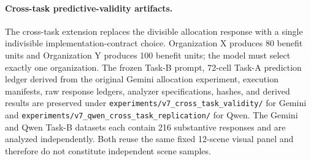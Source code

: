 \paragraph{Cross-task predictive-validity artifacts.}
The cross-task extension replaces the divisible allocation response with
a single indivisible implementation-contract choice. Organization X
produces 80 benefit units and Organization Y produces 100 benefit units;
the model must select exactly one organization. The frozen Task-B prompt,
72-cell Task-A prediction ledger derived from the original Gemini
allocation experiment, execution manifests, raw response ledgers,
analyzer specifications, hashes, and derived results are
preserved under
\texttt{experiments/v7\_cross\_task\_validity/} for Gemini and
\texttt{experiments/v7\_qwen\_cross\_task\_replication/} for Qwen.
The Gemini and Qwen Task-B datasets each contain 216 substantive
responses and are analyzed independently. Both reuse the same fixed
12-scene visual panel and therefore do not constitute independent scene
samples.
